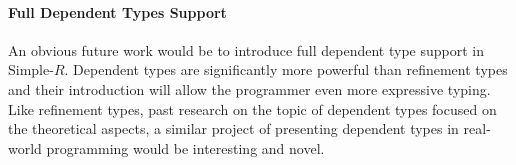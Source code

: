 \documentclass[a4paper,12pt]{report}
\begin{document}
\paragraph{Full Dependent Types Support} An obvious future work would be to 
introduce full dependent type support in Simple-$R$. Dependent types are 
significantly more powerful than refinement types and their introduction 
will allow the programmer even more expressive typing. 
Like refinement types, past research on the topic of dependent types focused on 
the theoretical aspects, a similar project of presenting 
dependent types in real-world programming would be interesting and novel. 

\appendix
\singlespacing

\printbibliography
\end{document}
